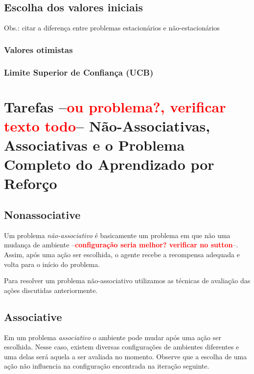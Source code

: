 \documentclass{article}
\newcommand{\todo}[1]{ --\textcolor{red}{\textbf{#1}}--}
\begin{document}
        \subsection{Escolha dos valores iniciais}
            
            Obs.: citar a diferença entre problemas estacionários e não-estacionários
            
            \subsubsection{Valores otimistas}
            
            \subsubsection{Limite Superior de Confiança (UCB)}
            
    \section{Tarefas \todo{ou problema?, verificar texto todo} Não-Associativas, Associativas e o Problema Completo do Aprendizado por Reforço}
    
        \subsection{Nonassociative}
        
            Um problema \emph{não-associativo} é basicamente um problema em que não uma mudança de ambiente \todo{configuração seria melhor? verificar no sutton}. Assim, após uma ação ser escolhida, o agente recebe a recompensa adequada e volta para o início do problema. 
            
            \begin{center}
                \simplebandit
            \end{center}
            
            Para resolver um problema não-associativo utilizamos as técnicas de avaliação das ações discutidas anteriormente.
    
        \subsection{Associative}
        
            Em um problema \emph{associativo} o ambiente pode mudar após uma ação ser escolhida. Nesse caso, existem diversas configurações de ambientes diferentes e uma delas será aquela a ser avaliada no momento. Observe que a escolha de uma ação não influencia na configuração encontrada na iteração seguinte.
    
\end{document}
